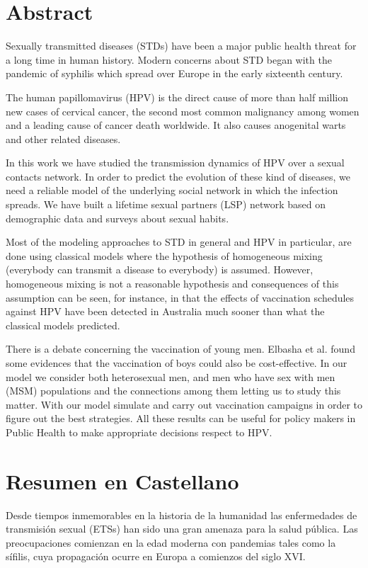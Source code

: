 
\chapter*{Abstract}
Sexually transmitted diseases (STDs) have been a major public health threat for a long time in human history. Modern concerns about STD began with the pandemic of syphilis which spread over Europe in the early sixteenth century. 

The human papillomavirus (HPV) is the direct cause of more than half million new cases of cervical cancer, the second most common malignancy among women and a leading cause of cancer death worldwide. It also causes anogenital warts and other related diseases.

In this work we have studied the transmission dynamics of HPV over a sexual contacts network. In order to predict the evolution of these kind of diseases, we need a reliable model of the underlying social network in which the infection spreads. We have built a lifetime sexual partners (LSP) network based on demographic data and surveys about sexual habits.

Most of the modeling approaches to STD in general and HPV in particular, are done using classical models where the hypothesis of homogeneous mixing (everybody can transmit a disease to everybody) is assumed. However, homogeneous mixing is not a reasonable hypothesis and consequences of this assumption can be seen, for instance, in that the effects of vaccination schedules against HPV have been detected in Australia much sooner than what the classical models predicted. %

There is a debate concerning the vaccination of young men. Elbasha et al. found some evidences that the vaccination of boys could also be cost-effective. In our model we consider both heterosexual men, and men who have sex with men (MSM) populations and the connections among them letting us to study this matter. With our model simulate and carry out vaccination campaigns in order to figure out the best strategies. All these results can be useful for policy makers in Public Health to make appropriate decisions respect to HPV.

\chapter*{Resumen en Castellano}
Desde tiempos inmemorables en la historia de la humanidad las enfermedades de transmisi\'on sexual (ETSs) han sido una gran amenaza para la salud p\'ublica. Las preocupaciones comienzan en la edad moderna con pandemias tales como la s\'ifilis, cuya propagaci\'on ocurre en Europa a comienzos del siglo XVI.

